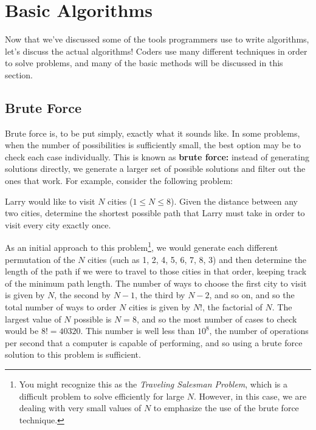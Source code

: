 \chapter{Basic Algorithms}

Now that we've discussed some of the tools programmers use to write algorithms, let's discuss the actual algorithms!  Coders use many different techniques in order to solve problems, and many of the basic methods will be discussed in this section.

\section{Brute Force}

Brute force is, to be put simply, exactly what it sounds like.  In some problems, when the number of possibilities is sufficiently small, the best option may be to check each case individually.  This is known as \textbf{brute force:} instead of generating solutions directly, we generate a larger set of possible solutions and filter out the ones that work.
For example, consider the following problem:

\begin{Problem}
Larry would like to visit $ N $ cities ($1 \leq N \leq 8$).  Given the distance between any two cities, determine the shortest possible path that Larry must take in order to visit every city exactly once.
\end{Problem}

As an initial approach to this problem\footnote{You might recognize this as the \textit{Traveling Salesman Problem}, which is a difficult problem to solve efficiently for large $ N $.  However, in this case, we are dealing with very small values of $ N $ to emphasize the use of the brute force technique.}, we would generate each different permutation of the $ N $ cities (such as 1, 2, 4, 5, 6, 7, 8, 3) and then determine the length of the path if we were to travel to those cities in that order, keeping track of the minimum path length.  The number of ways to choose the first city to visit is given by $ N $, the second by $ N - 1 $, the third by $ N - 2 $, and so on, and so the total number of ways to order $ N $ cities is given by $ N! $, the factorial of $ N $.  The largest value of $ N $ possible is $ N = 8 $, and so the most number of cases to check would be $ 8! = 40320 $.  This number is well less than $ 10^8 $, the number of operations per second that a computer is capable of performing, and so using a brute force solution to this problem is sufficient.

